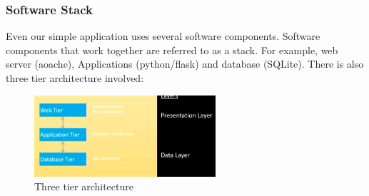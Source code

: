 \documentclass[a4paper]{article}
\theoremstyle{plain}
\theoremstyle{definition}
\theoremstyle{remark}
\begin{document}
\begin{flushleft}
\subsubsection{Software Stack}
Even our simple application uses several software components. Software components that work together are referred to as a stack. For example, web server (aoache), Applications (python/flask) and database (SQLite). There is also three tier architecture involved:
\begin{figure}[H]
	\centering
	\includegraphics[width=0.6\textwidth]{figures/layer.png}
	\caption{Three tier architecture}
	\label{fig:figures-layer-png}
\end{figure}

\end{flushleft}
\end{document}
